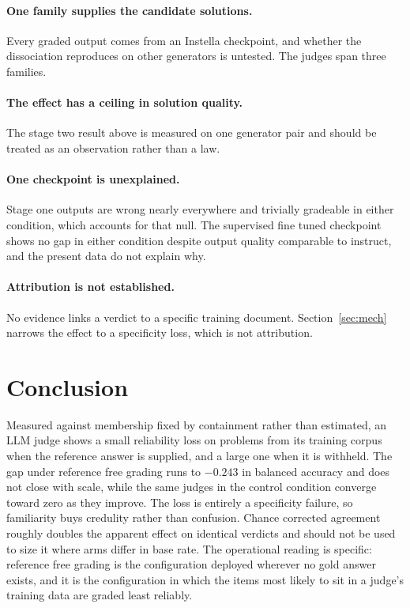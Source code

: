 \paragraph{One family supplies the candidate solutions.} Every graded output comes from an
Instella checkpoint, and whether the dissociation reproduces on other generators is untested.
The judges span three families.

\paragraph{The effect has a ceiling in solution quality.} The stage two result above is
measured on one generator pair and should be treated as an observation rather than a law.

\paragraph{One checkpoint is unexplained.} Stage one outputs are wrong nearly everywhere and
trivially gradeable in either condition, which accounts for that null. The supervised fine
tuned checkpoint shows no gap in either condition despite output quality comparable to
instruct, and the present data do not explain why.

\paragraph{Attribution is not established.} No evidence links a verdict to a specific
training document. Section~\ref{sec:mech} narrows the effect to a specificity loss, which is
not attribution.

\section{Conclusion}

Measured against membership fixed by containment rather than estimated, an LLM judge shows a
small reliability loss on problems from its training corpus when the reference answer is
supplied, and a large one when it is withheld. The gap under reference free grading runs to
$-0.243$ in balanced accuracy and does not close with scale, while the same judges in the
control condition converge toward zero as they improve. The loss is entirely a specificity
failure, so familiarity buys credulity rather than confusion. Chance corrected agreement
roughly doubles the apparent effect on identical verdicts and should not be used to size it
where arms differ in base rate. The operational reading is specific: reference free grading
is the configuration deployed wherever no gold answer exists, and it is the configuration in
which the items most likely to sit in a judge's training data are graded least reliably.
